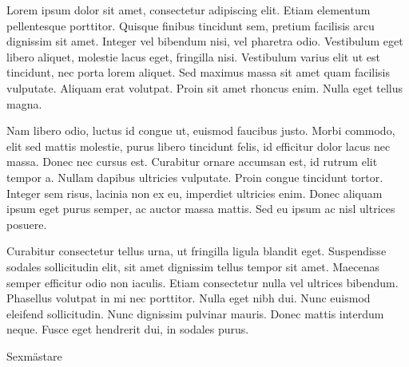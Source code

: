 \documentclass[../_main/handlingar.tex]{subfiles}
\begin{document}

Lorem ipsum dolor sit amet, consectetur adipiscing elit. Etiam elementum pellentesque porttitor. Quisque finibus tincidunt sem, pretium facilisis arcu dignissim sit amet. Integer vel bibendum nisi, vel pharetra odio. Vestibulum eget libero aliquet, molestie lacus eget, fringilla nisi. Vestibulum varius elit ut est tincidunt, nec porta lorem aliquet. Sed maximus massa sit amet quam facilisis vulputate. Aliquam erat volutpat. Proin sit amet rhoncus enim. Nulla eget tellus magna.

Nam libero odio, luctus id congue ut, euismod faucibus justo. Morbi commodo, elit sed mattis molestie, purus libero tincidunt felis, id efficitur dolor lacus nec massa. Donec nec cursus est. Curabitur ornare accumsan est, id rutrum elit tempor a. Nullam dapibus ultricies vulputate. Proin congue tincidunt tortor. Integer sem risus, lacinia non ex eu, imperdiet ultricies enim. Donec aliquam ipsum eget purus semper, ac auctor massa mattis. Sed eu ipsum ac nisl ultrices posuere.

Curabitur consectetur tellus urna, ut fringilla ligula blandit eget. Suspendisse sodales sollicitudin elit, sit amet dignissim tellus tempor sit amet. Maecenas semper efficitur odio non iaculis. Etiam consectetur nulla vel ultrices bibendum. Phasellus volutpat in mi nec porttitor. Nulla eget nibh dui. Nunc euismod eleifend sollicitudin. Nunc dignissim pulvinar mauris. Donec mattis interdum neque. Fusce eget hendrerit dui, in sodales purus.

\begin{signatures}{1}
    \mvh
    \signature{Martin Gemborn Nilsson}{Sexmästare}
\end{signatures}
\end{document}
